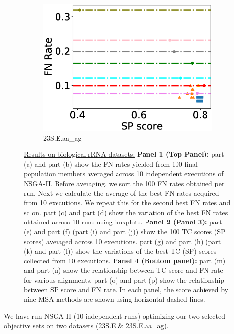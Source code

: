 \begin{figure}[!htbp]
\begin{adjustwidth}{-0.5cm}{-0.5cm}
\begin{subfigure}{0.26\textwidth}
			\includegraphics[width=\columnwidth]{Figure/summary/precomputedInit/23S.E.aa_ag/fnrate_vs_sp}
			\caption{23S.E.aa\_ag}
\end{subfigure}
	
	\caption[Results on biological rRNA datasets]{\underline{Results on biological rRNA datasets:} \textbf{Panel 1 (Top Panel):} part (a) and part (b) show the FN rates yielded from 100 final population members averaged across 10 independent executions of NSGA-II. Before averaging, we sort the 100 FN rates obtained per run. Next we calculate the average of the best FN rates acquired from 10 executions. We repeat this for the second best FN rates and so on.
		part (c) and part (d) show the variation of the best FN rates obtained across 10 runs using boxplots.  \textbf{Panel 2 (Panel 3):} part (e) and part (f) (part (i) and part (j)) show the 100 TC scores (SP scores) averaged across 10 executions. 
part (g) and part (h) (part (k) and part (l)) show the variations of the best TC (SP) scores collected from 10 executions.
\textbf{Panel 4 (Bottom panel):} part (m) and part (n) show the relationship between TC score and FN rate for various alignments. part (o) and part (p) show the relationship between SP score and FN rate. In each panel, the score achieved by nine MSA methods are shown using horizontal dashed lines.
	}
	\label{fig:fn_rate_tc_sp_bio}
\end{adjustwidth}
\end{figure}
We have run NSGA-II (10 independent runs) optimizing our two selected objective sets on two datasets (23S.E \& 23S.E.aa\_ag). 
